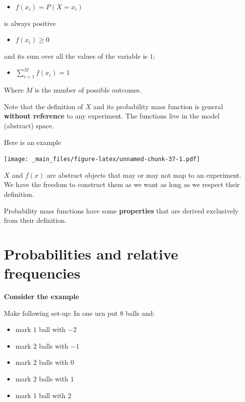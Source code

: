 \documentclass[
]{book}
\providecommand{\tightlist}{%
  \setlength{\itemsep}{0pt}\setlength{\parskip}{0pt}}
\begin{document}
\begin{itemize}
\tightlist
\item
  \(f(x_i)=P(X=x_i)\)
\end{itemize}

is always positive

\begin{itemize}
\tightlist
\item
  \(f(x_i)\geq 0\)
\end{itemize}

and its sum over all the values of the variable is \(1\):

\begin{itemize}
\tightlist
\item
  \(\sum_{i=1}^M f(x_i)=1\)
\end{itemize}

Where \(M\) is the number of possible outcomes.

Note that the definition of \(X\) and its probability mass function is general \textbf{without reference} to any experiment. The functions live in the model (abstract) space.

Here is an example

\texttt{[image: \_main\_files/figure-latex/unnamed-chunk-37-1.pdf]}

\(X\) and \(f(x)\) are abstract objects that may or may not map to an experiment. We have the freedom to construct them as we want as long as we respect their definition.

Probability mass functions have some \textbf{properties} that are derived exclusively from their definition.

\hypertarget{probabilities-and-relative-frequencies}{%
\section{Probabilities and relative frequencies}\label{probabilities-and-relative-frequencies}}

\textbf{Consider the example}

Make following set-up: In one urn put \(8\) balls and:

\begin{itemize}
\tightlist
\item
  mark \(1\) ball with \(-2\)
\item
  mark \(2\) balls with \(-1\)
\item
  mark \(2\) balls with \(0\)
\item
  mark \(2\) balls with \(1\)
\item
  mark \(1\) ball with \(2\)
\end{itemize}
\end{document}
